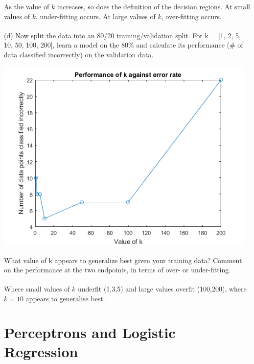 \documentclass[]{report}   %
\begin{document}
{As the value of $k$ increases, so does the definition of the decision regions. At small values of $k$, under-fitting occurs. At large values of $k$, over-fitting occurs.}
\\~\\
{(d) Now split the data into an 80/20 training/validation split. For k = [1, 2, 5, 10, 50, 100, 200], learn a model on the 80$\%$ and calculate its performance ($\#$ of data classified incorrectly) on the validation data.}
\begin{center}
	\includegraphics[width=35em]{2_4_Figure_6.png}
\end{center} 
{What value of k appears to generalize best given your training data? Comment on the performance at the two endpoints, in terms of over- or under-fitting.} \\~\\
{Where small values of $k$ underfit (1,3,5) and large values overfit (100,200), where $k = 10$ appears to generalise best.}



\section{Perceptrons and Logistic Regression}
\end{document}

